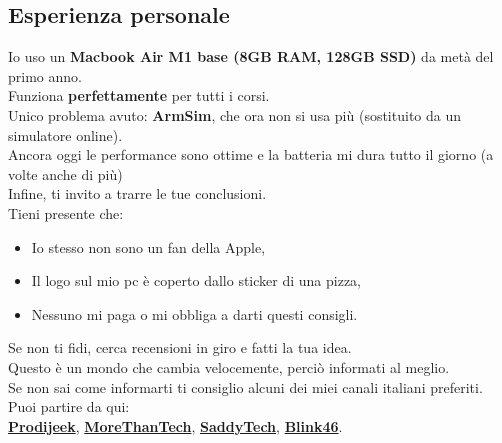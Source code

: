 \documentclass[18pt]{extarticle}
\begin{document}
\subsection{Esperienza personale}
Io uso un \textbf{Macbook Air M1 base (8GB RAM, 128GB SSD)} da metà del primo anno.\\
Funziona \textbf{perfettamente} per tutti i corsi.\\
Unico problema avuto: \textbf{ArmSim}, che ora non si usa più (sostituito da un simulatore online).\\
Ancora oggi le performance sono ottime e la batteria mi dura tutto il giorno (a volte anche di più)\\
Infine, ti invito a trarre le tue conclusioni.\\
Tieni presente che:
\begin{itemize}
\item Io stesso non sono un fan della Apple,
\item Il logo sul mio pc è coperto dallo sticker di una pizza,
\item Nessuno mi paga o mi obbliga a darti questi consigli.
\end{itemize}%
Se non ti fidi, cerca recensioni in giro e fatti la tua idea.\\
Questo è un mondo che cambia velocemente, perciò informati al meglio.\\
Se non sai come informarti ti consiglio alcuni dei miei canali italiani preferiti. Puoi partire da qui:\\
\href{https://www.youtube.com/@Prodigeek}{\textbf{Prodijeek}}, \href{https://www.youtube.com/@MoreThanTech}{\textbf{MoreThanTech}}, \href{https://www.youtube.com/@SaddyTech}{\textbf{SaddyTech}}, \href{https://www.youtube.com/@Blink46yt}{\textbf{Blink46}}.

\clearpage
\end{document}

